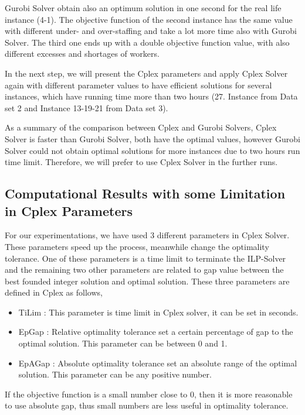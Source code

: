 Gurobi Solver obtain also an optimum solution in one second for the real life instance (4-1).  The objective function of the second instance has the same value with different under- and over-staffing and take a lot more time also with Gurobi Solver. The third one ends up with a double objective function value, with also different excesses and shortages of workers.

In the next step, we will present the Cplex parameters and apply Cplex Solver again with different parameter values to have efficient solutions for several instances, which have running time more than two hours (27. Instance from Data set 2 and Instance 13-19-21 from Data set 3). 

As a summary of the comparison between Cplex and Gurobi Solvers, Cplex Solver is faster than Gurobi Solver, both have the optimal values, however Gurobi Solver could not obtain optimal solutions for more instances due to two hours run time limit. Therefore, we will prefer to use Cplex Solver in the further runs.

 
\subsection{Computational Results with some Limitation in Cplex Parameters }

For our experimentations, we have used 3 different parameters in Cplex Solver. These parameters speed up the process, meanwhile change the optimality tolerance. One of these parameters is a time limit to terminate the ILP-Solver and the remaining two other parameters are related to gap value between the best founded integer solution and optimal solution. These three parameters are defined in Cplex as follows,

\begin{itemize}
\item TiLim : This parameter is time limit in Cplex solver, it can be set in seconds.
\item EpGap : Relative optimality tolerance set a certain percentage of gap to the optimal solution. This parameter can be between 0 and 1.
\item EpAGap : Absolute optimality tolerance set an absolute range of the optimal solution. This parameter can be any positive number.
 \end{itemize}

If the objective function is a small number close to 0, then it is more reasonable to use absolute gap, thus small numbers are less useful in optimality tolerance.

